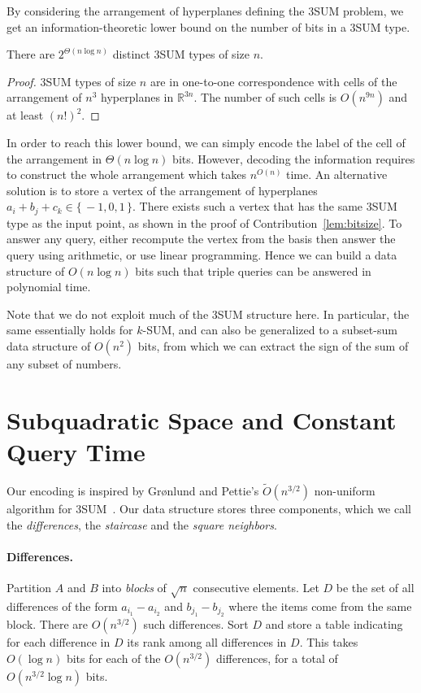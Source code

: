 By considering the arrangement of hyperplanes defining the 3SUM problem, we get an
information-theoretic lower bound on the number of bits in a 3SUM type.

\begin{lemma}
  There are $2^{\Theta(n\log n)}$ distinct 3SUM types of size $n$.
\end{lemma}
\begin{proof}
  3SUM types of size $n$ are in one-to-one correspondence with cells of the
  arrangement of $n^3$ hyperplanes in $\mathbb{R}^{3n}$. The
  number of such cells is $O(n^{9n})$ and at least ${(n!)}^2$.
\end{proof}

In order to reach this lower bound, we can simply
encode the label of the cell of the arrangement in \(\Theta(n \log n)\) bits.
However, decoding the information
requires to construct the whole arrangement which takes \(n^{O(n)}\) time.
An alternative solution is to store a
vertex of the arrangement of hyperplanes \(a_i + b_j + c_k \in \{\,
-1, 0, 1\,\}\).
There exists such a vertex that has the same 3SUM type as the input point, as
shown in the proof of Contribution~\ref{lem:bitsize}.
To answer any query, either recompute the vertex from the basis then answer the query using arithmetic,
or use linear programming.
Hence we can build a data structure of $O(n\log n)$ bits such that triple queries can be answered in polynomial time.

Note that we do not exploit much of the 3SUM structure here. In particular, the
same essentially holds for $k$-SUM, and can also be generalized to a
subset-sum data structure of $O(n^2)$ bits, from which we can extract the sign
of the sum of any subset of numbers.

\section{Subquadratic Space and Constant Query Time}%
\label{s:sscqt}

Our encoding is inspired by  Gr{\o}nlund and Pettie's $\tilde{O}(n^{3/2})$
non-uniform algorithm for 3SUM~\cite{GP18}.
Our data structure stores three components, which we call the
\emph{differences}, the \emph{staircase} and the \emph{square neighbors}.

\paragraph{Differences.}
  Partition $A$ and $B$ into \emph{blocks} of $\sqrt{n}$ consecutive elements.
  Let $D$ be the set of all differences of the form $a_{i_1}-a_{i_2}$ and
  $b_{j_1}-b_{j_2}$
  where the items come from the same block. There are $O(n^{3/2})$ such
  differences. Sort $D$ and store a table indicating for each difference in $D$
  its rank among all differences in $D$. This takes $O(\log n)$ bits for each
  of the $O(n^{3/2})$ differences, for a total of $O(n^{3/2}\log n)$ bits.

